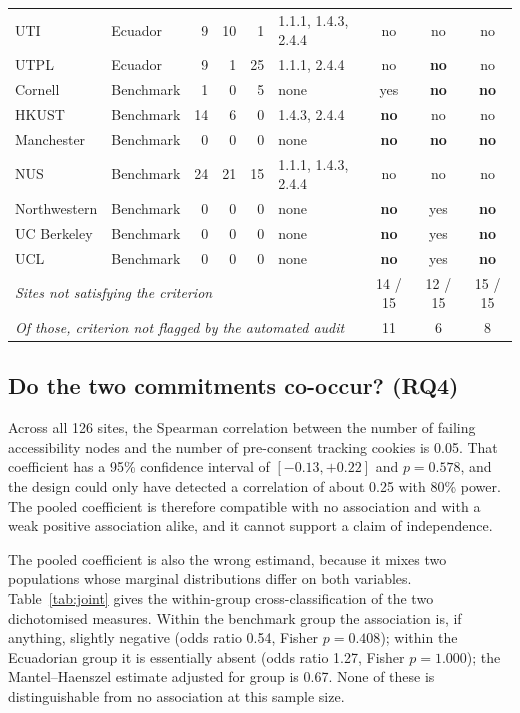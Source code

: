 \documentclass[pdflatex,sn-basic,Numbered,iicol]{sn-jnl}
\theoremstyle{thmstyleone}
\theoremstyle{thmstyletwo}
\theoremstyle{thmstylethree}
\begin{document}
\begin{table}[htbp]
\begin{tabular}{llrrrlccc}
		UTI          & Ecuador &  9 & 10 &  1 & 1.1.1, 1.4.3, 2.4.4 & no          & no          & no          \\
		UTPL         & Ecuador &  9 &  1 & 25 & 1.1.1, 2.4.4        & no          & \textbf{no} & no          \\
		\midrule
		Cornell      & Benchmark &  1 &  0 &  5 & none                & yes         & \textbf{no} & \textbf{no} \\
		HKUST        & Benchmark & 14 &  6 &  0 & 1.4.3, 2.4.4        & \textbf{no} & no          & no          \\
		Manchester   & Benchmark &  0 &  0 &  0 & none                & \textbf{no} & \textbf{no} & \textbf{no} \\
		NUS          & Benchmark & 24 & 21 & 15 & 1.1.1, 1.4.3, 2.4.4 & no          & no          & no          \\
		Northwestern & Benchmark &  0 &  0 &  0 & none                & \textbf{no} & yes         & \textbf{no} \\
		UC Berkeley  & Benchmark &  0 &  0 &  0 & none                & \textbf{no} & yes         & \textbf{no} \\
		UCL          & Benchmark &  0 &  0 &  0 & none                & \textbf{no} & yes         & \textbf{no} \\
		\midrule
		\multicolumn{6}{l}{\emph{Sites not satisfying the criterion}} & 14 / 15 & 12 / 15 & 15 / 15 \\
		\multicolumn{6}{l}{\emph{Of those, criterion not flagged by the automated audit}} & 11 & 6 & 8 \\
		\bottomrule
	\end{tabular}
\end{table}

\subsection{Do the two commitments co-occur? (RQ4)}\label{sec:results-joint}

Across all 126 sites, the Spearman correlation between the number of failing accessibility nodes and the number of pre-consent tracking cookies is 0.05. That coefficient has a 95\% confidence interval of $[-0.13, +0.22]$ and $p=0.578$, and the design could only have detected a correlation of about 0.25 with 80\% power. The pooled coefficient is therefore compatible with no association and with a weak positive association alike, and it cannot support a claim of independence.

The pooled coefficient is also the wrong estimand, because it mixes two populations whose marginal distributions differ on both variables. Table~\ref{tab:joint} gives the within-group cross-classification of the two dichotomised measures. Within the benchmark group the association is, if anything, slightly negative (odds ratio 0.54, Fisher $p=0.408$); within the Ecuadorian group it is essentially absent (odds ratio 1.27, Fisher $p=1.000$); the Mantel--Haenszel estimate adjusted for group is 0.67. None of these is distinguishable from no association at this sample size.
\end{document}
